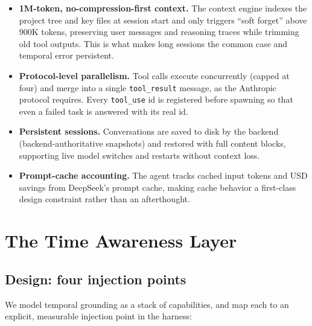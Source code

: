 \documentclass[10pt]{article}
\begin{document}
\begin{itemize}[leftmargin=1.4em,itemsep=1pt]
  \item \textbf{1M-token, no-compression-first context.} The context engine indexes
        the project tree and key files at session start and only triggers ``soft
        forget'' above 900K tokens, preserving user messages and reasoning traces
        while trimming old tool outputs. This is what makes long sessions the common
        case and temporal error persistent.
  \item \textbf{Protocol-level parallelism.} Tool calls execute concurrently
        (capped at four) and merge into a single \texttt{tool\_result} message, as
        the Anthropic protocol requires. Every \texttt{tool\_use} id is registered
        before spawning so that even a failed task is answered with its real id.
  \item \textbf{Persistent sessions.} Conversations are saved to disk by the backend
        (backend-authoritative snapshots) and restored with full content blocks,
        supporting live model switches and restarts without context loss.
  \item \textbf{Prompt-cache accounting.} The agent tracks cached input tokens and
        USD savings from DeepSeek's prompt cache, making cache behavior a first-class
        design constraint rather than an afterthought.
\end{itemize}

\section{The Time Awareness Layer}
\label{sec:tal}

\subsection{Design: four injection points}
\label{sec:design}

We model temporal grounding as a stack of capabilities, and map each to an explicit,
measurable injection point in the harness:
\end{document}
